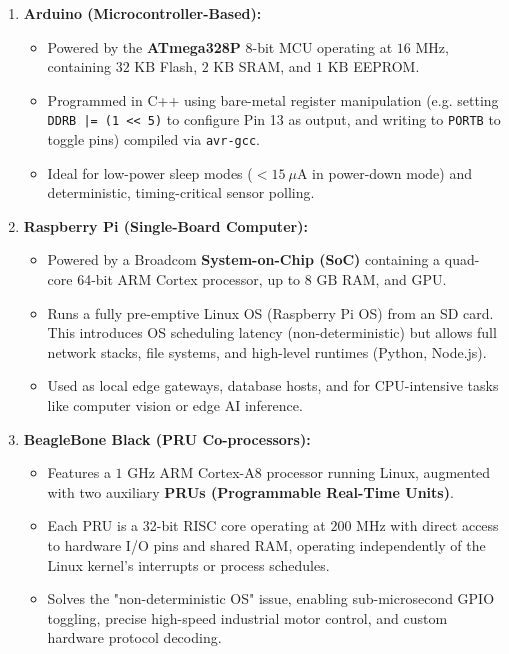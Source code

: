 \documentclass[12pt,a4paper]{article}
\begin{document}
\begin{enumerate}[leftmargin=*, itemsep=4.0pt]
  \item \textbf{Arduino (Microcontroller-Based):} 
        \begin{itemize}[leftmargin=*, label=$\bullet$, itemsep=1.5pt]
          \item Powered by the \textbf{ATmega328P} 8-bit MCU operating at $16\text{ MHz}$, containing $32\text{ KB}$ Flash, $2\text{ KB}$ SRAM, and $1\text{ KB}$ EEPROM.
          \item Programmed in C++ using bare-metal register manipulation (e.g. setting \texttt{DDRB |= (1 << 5)} to configure Pin 13 as output, and writing to \texttt{PORTB} to toggle pins) compiled via \texttt{avr-gcc}.
          \item Ideal for low-power sleep modes ($<15\ \mu\text{A}$ in power-down mode) and deterministic, timing-critical sensor polling.
        \end{itemize}
  \item \textbf{Raspberry Pi (Single-Board Computer):}
        \begin{itemize}[leftmargin=*, label=$\bullet$, itemsep=1.5pt]
          \item Powered by a Broadcom \textbf{System-on-Chip (SoC)} containing a quad-core 64-bit ARM Cortex processor, up to $8\text{ GB}$ RAM, and GPU.
          \item Runs a fully pre-emptive Linux OS (Raspberry Pi OS) from an SD card. This introduces OS scheduling latency (non-deterministic) but allows full network stacks, file systems, and high-level runtimes (Python, Node.js).
          \item Used as local edge gateways, database hosts, and for CPU-intensive tasks like computer vision or edge AI inference.
        \end{itemize}
  \item \textbf{BeagleBone Black (PRU Co-processors):}
        \begin{itemize}[leftmargin=*, label=$\bullet$, itemsep=1.5pt]
          \item Features a $1\text{ GHz}$ ARM Cortex-A8 processor running Linux, augmented with two auxiliary \textbf{PRUs (Programmable Real-Time Units)}.
          \item Each PRU is a 32-bit RISC core operating at $200\text{ MHz}$ with direct access to hardware I/O pins and shared RAM, operating independently of the Linux kernel's interrupts or process schedules.
          \item Solves the "non-deterministic OS" issue, enabling sub-microsecond GPIO toggling, precise high-speed industrial motor control, and custom hardware protocol decoding.

\end{itemize}
\end{enumerate}
\end{document}
